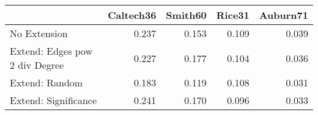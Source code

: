 \begin{tabular}{lrrrr}
\toprule
{} & Caltech36 & Smith60 & Rice31 & Auburn71 \\
\midrule
No Extension                   &     0.237 &   0.153 &  0.109 &    0.039 \\
Extend: Edges pow 2 div Degree &     0.227 &   0.177 &  0.104 &    0.036 \\
Extend: Random                 &     0.183 &   0.119 &  0.108 &    0.031 \\
Extend: Significance           &     0.241 &   0.170 &  0.096 &    0.033 \\
\bottomrule
\end{tabular}

